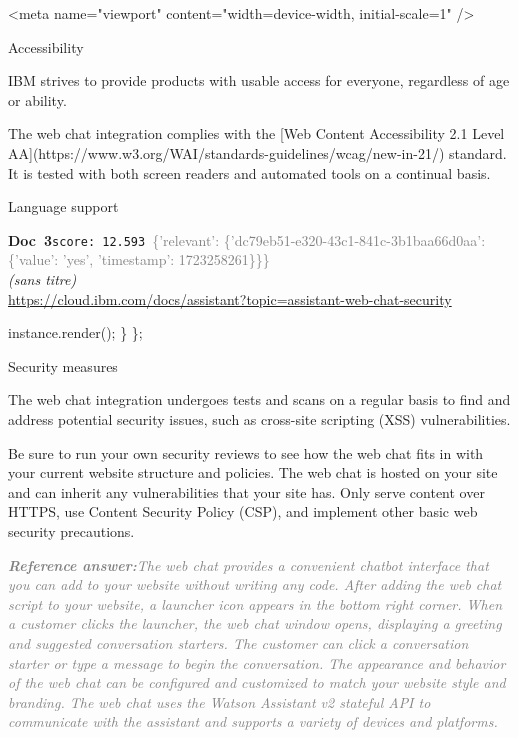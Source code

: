 \documentclass[a4paper,11pt]{article}
\begin{document}
\begin{docenv}
{<meta name="viewport" content="width=device-width, initial-scale=1" />





 Accessibility 

IBM strives to provide products with usable access for everyone, regardless of age or ability.

The web chat integration complies with the [Web Content Accessibility 2.1 Level AA](https://www.w3.org/WAI/standards-guidelines/wcag/new-in-21/) standard. It is tested with both screen readers and automated tools on a continual basis.





 Language support}
\end{docenv}
\begin{docenv}
{\footnotesize\textcolor{doccolor}{\textbf{Doc~3}}}\hfill{\tiny\texttt{score:~12.593}}\ {\tiny\textcolor{gray}{\{'relevant': \{'dc79eb51-e320-43c1-841c-3b1baa66d0aa': \{'value': 'yes', 'timestamp': 1723258261\}\}\}}}\\[3pt]
{\small\textit{(sans titre)}}\\[2pt]
{\tiny\url{https://cloud.ibm.com/docs/assistant?topic=assistant-web-chat-security}}\\[4pt]
{\footnotesize 
instance.render();
\}
\};







 Security measures 

The web chat integration undergoes tests and scans on a regular basis to find and address potential security issues, such as cross-site scripting (XSS) vulnerabilities.

Be sure to run your own security reviews to see how the web chat fits in with your current website structure and policies. The web chat is hosted on your site and can inherit any vulnerabilities that your site has. Only serve content over HTTPS, use Content Security Policy (CSP), and implement other basic web security precautions.}
\end{docenv}
\begin{refanswerenv}
{\footnotesize\textit{\textcolor{gray}{\textbf{Reference answer:}\enspace The web chat provides a convenient chatbot interface that you can add to your website without writing any code. After adding the web chat script to your website, a launcher icon appears in the bottom right corner. When a customer clicks the launcher, the web chat window opens, displaying a greeting and suggested conversation starters. The customer can click a conversation starter or type a message to begin the conversation. The appearance and behavior of the web chat can be configured and customized to match your website style and branding. The web chat uses the Watson Assistant v2 stateful API to communicate with the assistant and supports a variety of devices and platforms.}}}
\end{refanswerenv}
\end{document}
